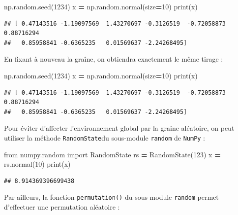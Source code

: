 \documentclass[12pt,]{book}
\newenvironment{Shaded}{\begin{snugshade}}{\end{snugshade}}
\newcommand{\DecValTok}[1]{\textcolor[rgb]{0.00,0.00,0.81}{#1}}
\newcommand{\ImportTok}[1]{#1}
\newcommand{\OperatorTok}[1]{\textcolor[rgb]{0.81,0.36,0.00}{\textbf{#1}}}
\newcommand{\BuiltInTok}[1]{#1}
\newcommand{\NormalTok}[1]{#1}
\numberwithin{equation}{section}
\numberwithin{countremarque}{section}
\begin{document}
\begin{Shaded}
\begin{Highlighting}[]
\NormalTok{np.random.seed(}\DecValTok{1234}\NormalTok{)}
\NormalTok{x }\OperatorTok{=}\NormalTok{ np.random.normal(size}\OperatorTok{=}\DecValTok{10}\NormalTok{)}
\BuiltInTok{print}\NormalTok{(x)}
\end{Highlighting}
\end{Shaded}

\begin{lstlisting}
## [ 0.47143516 -1.19097569  1.43270697 -0.3126519  -0.72058873  0.88716294
##   0.85958841 -0.6365235   0.01569637 -2.24268495]
\end{lstlisting}

En fixant à nouveau la graîne, on obtiendra exactement le même tirage :

\begin{Shaded}
\begin{Highlighting}[]
\NormalTok{np.random.seed(}\DecValTok{1234}\NormalTok{)}
\NormalTok{x }\OperatorTok{=}\NormalTok{ np.random.normal(size}\OperatorTok{=}\DecValTok{10}\NormalTok{)}
\BuiltInTok{print}\NormalTok{(x)}
\end{Highlighting}
\end{Shaded}

\begin{lstlisting}
## [ 0.47143516 -1.19097569  1.43270697 -0.3126519  -0.72058873  0.88716294
##   0.85958841 -0.6365235   0.01569637 -2.24268495]
\end{lstlisting}

Pour éviter d'affecter l'environnement global par la graine aléatoire,
on peut utiliser la méthode \texttt{RandomState}du sous-module
\texttt{random} de \texttt{NumPy} :

\begin{Shaded}
\begin{Highlighting}[]
\ImportTok{from}\NormalTok{ numpy.random }\ImportTok{import}\NormalTok{ RandomState}
\NormalTok{rs }\OperatorTok{=}\NormalTok{ RandomState(}\DecValTok{123}\NormalTok{)}
\NormalTok{x }\OperatorTok{=}\NormalTok{ rs.normal(}\DecValTok{10}\NormalTok{)}
\BuiltInTok{print}\NormalTok{(x)}
\end{Highlighting}
\end{Shaded}

\begin{lstlisting}
## 8.914369396699438
\end{lstlisting}

Par ailleurs, la fonction \texttt{permutation()} du sous-module
\texttt{random} permet d'effectuer une permutation aléatoire :
\end{document}
